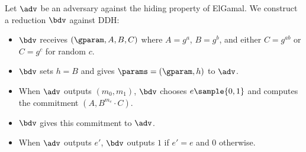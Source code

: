 \ifsolutions
\begin{mysolution}
   Let $\adv$ be an adversary against the hiding property of ElGamal.
  We construct a \ppt reduction $\bdv$ against DDH:
  \begin{itemize}
    \item $\bdv$ receives $(\gparam, A, B, C)$ where $A = g^a$, $B = g^b$, and either $C = g^{ab}$ or $C = g^c$ for random $c$.
    \item $\bdv$ sets $h = B$ and gives $\params = (\gparam, h)$ to $\adv$.
    \item When $\adv$ outputs $(m_0, m_1)$, $\bdv$ chooses $e \sample \{0, 1\}$ and computes the commitment $(A, B^{m_e} \cdot C)$.
    \item $\bdv$ gives this commitment to $\adv$.
    \item When $\adv$ outputs $e'$, $\bdv$ outputs $1$ if $e' = e$ and $0$ otherwise.
  \end{itemize}


\end{mysolution}
